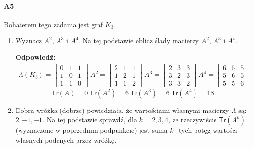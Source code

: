 \paragraph{A5} Bohaterem tego zadania jest graf $K_3$.
\begin{enumerate}[label=\alph*)]
\item Wyznacz $A^2$, $A^3$ i $A^4$. Na tej podstawie oblicz ślady macierzy $A^2$, $A^3$ i $A^4$.

\textbf{Odpowiedź:}
\begin{align*}
A(K_3)=\begin{bmatrix}
0&1&1\\
1&0&1\\
1&1&0
\end{bmatrix}\ 
A^2=\begin{bmatrix}
2&1&1\\1&2&1\\1&1&2
\end{bmatrix}\ 
A^3=\begin{bmatrix}
2&3&3\\3&2&3\\3&3&2
\end{bmatrix}\ 
A^4=\begin{bmatrix}
6&5&5\\5&6&5\\5&5&6
\end{bmatrix}
\end{align*}
$$\mathsf{Tr}(A)=0\ \mathsf{Tr}(A^2)=6\ \mathsf{Tr}(A^3)=6\ \mathsf{Tr}(A^4)=18$$
\item Dobra wróżka (dobrze) powiedziała, że wartościami własnymi macierzy $A$ są: $2,-1,-1$. Na tej podstawie sprawdź, dla $k = 2, 3, 4$, że rzeczywiście $\mathsf{Tr}(A^k)$ (wyznaczone w poprzednim podpunkcie) jest sumą $k$– tych potęg wartości własnych podanych przez wróżkę.


\end{enumerate}

